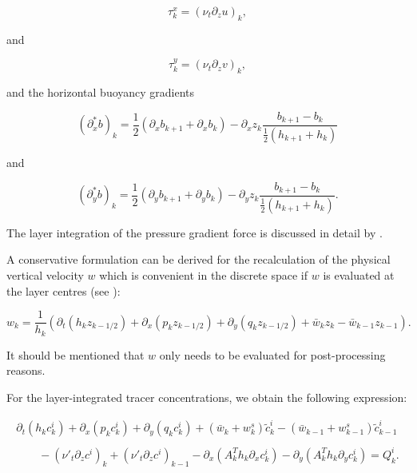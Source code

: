 \begin{equation}\label{tauxkdef}
\tau^x_k = \left(\nu_t \partial_z u \right)_k,
\end{equation}

and 

\begin{equation}\label{tauykdef}
\tau^y_k = \left(\nu_t \partial_z v \right)_k,
\end{equation}

and the horizontal buoyancy gradients

\begin{equation}
(\partial^*_xb)_k=\frac12(\partial_xb_{k+1}+\partial_x b_k)
-\partial_xz_k\frac{b_{k+1}-b_k}{\frac12(h_{k+1}+h_k)}
\end{equation}

and 

\begin{equation}
(\partial^*_yb)_k=\frac12(\partial_yb_{k+1}+\partial_y b_k)
-\partial_yz_k\frac{b_{k+1}-b_k}{\frac12(h_{k+1}+h_k)}.
\end{equation}

The layer integration of the pressure gradient force 
is discussed in detail by \cite{BURCHARDea97}.

A conservative formulation can be derived 
for the recalculation of the physical vertical velocity
$w$ which is convenient
in the discrete space if $w$ is evaluated at the layer centres
(see \cite{DELEERSNIJDERea92}):

\begin{equation}\label{conservative_w}
w_k=\frac{1}{h_k}\left(
\partial_t(h_kz_{k-1/2})+\partial_x(p_kz_{k-1/2})+\partial_y(q_kz_{k-1/2})
+\bar w_kz_k-\bar w_{k-1}z_{k-1}\right).
\end{equation}

It should be mentioned that $w$ only needs to be evaluated for
post-processing reasons.

For the layer-integrated tracer concentrations, we obtain 
the following expression:

\begin{equation}\label{C_Layer_Int}
\begin{array}{l}
\partial_t (h_k c^i_k) + \partial_x (p_kc^i_k)+\partial_y (q_k c^i_k)
+(\bar w_k+w^s_k) \tilde c^i_k 
- (\bar w_{k-1}+w^s_{k-1}) \tilde c^i_{k-1}\\
\\ \qquad
-(\nu'_t\partial_z c^i)_{k}
+(\nu'_t\partial_z c^i)_{k-1}
-\partial_x\left(A_k^Th_k\partial_xc^i_k\right)
-\partial_y\left(A_k^Th_k\partial_yc^i_k\right)
=Q^i_k.
\end{array}
\end{equation}

